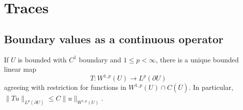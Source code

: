 \section{Traces}
\label{sec:5-5}

\subsection{Boundary values as a continuous operator}
\begin{theorem}\label{thm:5-trace}
If $U$ is bounded with $C^1$ boundary and $1\leq p<\infty$, there is a
unique bounded linear map
\[
 T:W^{1,p}(U)\longrightarrow L^p(\partial U)
\]
agreeing with restriction for functions in $W^{1,p}(U)\cap C(\overline U)$.
In particular, $\|Tu\|_{L^p(\partial U)}\leq C\|u\|_{W^{1,p}(U)}$.
\end{theorem}
\Needspace{45mm}
